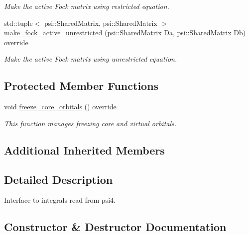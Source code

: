 \begin{DoxyCompactItemize}
\begin{DoxyCompactList}\small\item\em Make the active Fock matrix using restricted equation. \end{DoxyCompactList}\item 
std\+::tuple$<$ psi\+::\+Shared\+Matrix, psi\+::\+Shared\+Matrix $>$ \mbox{\hyperlink{classforte_1_1_psi4_integrals_a42f39301293e0b8048412cb833420797}{make\+\_\+fock\+\_\+active\+\_\+unrestricted}} (psi\+::\+Shared\+Matrix Da, psi\+::\+Shared\+Matrix Db) override
\begin{DoxyCompactList}\small\item\em Make the active Fock matrix using unrestricted equation. \end{DoxyCompactList}\end{DoxyCompactItemize}
\subsection*{Protected Member Functions}
\begin{DoxyCompactItemize}
\item 
void \mbox{\hyperlink{classforte_1_1_psi4_integrals_ae547d05a2ada31f05a5e3dc58c9630c3}{freeze\+\_\+core\+\_\+orbitals}} () override
\begin{DoxyCompactList}\small\item\em This function manages freezing core and virtual orbitals. \end{DoxyCompactList}\end{DoxyCompactItemize}
\subsection*{Additional Inherited Members}


\subsection{Detailed Description}
Interface to integrals read from psi4. 

\subsection{Constructor \& Destructor Documentation}
\mbox{\label{classforte_1_1_psi4_integrals_a5c8007878380052c9128bd0ed78229b3}} 
